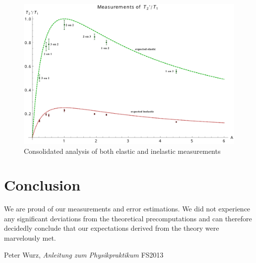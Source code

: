 \documentclass{scrreprt}
\renewcommand{\emph}[1]{\textit{#1}}
\begin{document}
\begin{figure}[H]
	\centering
  \includegraphics[width=1.0\textwidth]{diag/analysis.pdf}
	\caption{Consolidated analysis of both elastic and inelastic measurements}
	\label{fig:analysis}
\end{figure}

\section{Conclusion}
We are proud of our measurements and error estimations. We did not experience any significant deviations from the theoretical precomputations and can therefore decidedly conclude that our expectations derived from the theory were marvelously met. 

\begin{thebibliography}{9}
  Peter Wurz,
  \emph{Anleitung zum Physikpraktikum}
  FS2013

\end{thebibliography}
\end{document}
